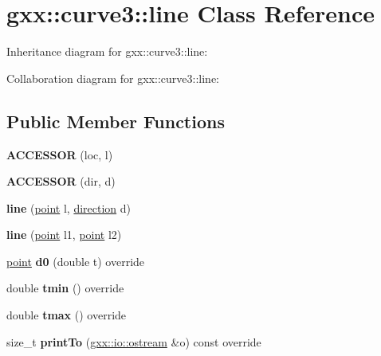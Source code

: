 \hypertarget{classgxx_1_1curve3_1_1line}{}\section{gxx\+:\+:curve3\+:\+:line Class Reference}
\label{classgxx_1_1curve3_1_1line}


Inheritance diagram for gxx\+:\+:curve3\+:\+:line\+:


Collaboration diagram for gxx\+:\+:curve3\+:\+:line\+:
\subsection*{Public Member Functions}
\begin{DoxyCompactItemize}
\item 
{\bfseries A\+C\+C\+E\+S\+S\+OR} (loc, l)\hypertarget{classgxx_1_1curve3_1_1line_a1ec94798b9efa81942915b0102aa3e0a}{}\label{classgxx_1_1curve3_1_1line_a1ec94798b9efa81942915b0102aa3e0a}

\item 
{\bfseries A\+C\+C\+E\+S\+S\+OR} (dir, d)\hypertarget{classgxx_1_1curve3_1_1line_ad53840b1f5abb3e4268d0608aeb6c220}{}\label{classgxx_1_1curve3_1_1line_ad53840b1f5abb3e4268d0608aeb6c220}

\item 
{\bfseries line} (\hyperlink{classgxx_1_1geom3_1_1point}{point} l, \hyperlink{classgxx_1_1geom3_1_1direction}{direction} d)\hypertarget{classgxx_1_1curve3_1_1line_affa66b223b6e57701a8d1c7cd0e0524d}{}\label{classgxx_1_1curve3_1_1line_affa66b223b6e57701a8d1c7cd0e0524d}

\item 
{\bfseries line} (\hyperlink{classgxx_1_1geom3_1_1point}{point} l1, \hyperlink{classgxx_1_1geom3_1_1point}{point} l2)\hypertarget{classgxx_1_1curve3_1_1line_ae2d76333ac4c3efbd1cbb59148359b4d}{}\label{classgxx_1_1curve3_1_1line_ae2d76333ac4c3efbd1cbb59148359b4d}

\item 
\hyperlink{classgxx_1_1geom3_1_1point}{point} {\bfseries d0} (double t) override\hypertarget{classgxx_1_1curve3_1_1line_a2ce5a22ed3b09aed447629135a938879}{}\label{classgxx_1_1curve3_1_1line_a2ce5a22ed3b09aed447629135a938879}

\item 
double {\bfseries tmin} () override\hypertarget{classgxx_1_1curve3_1_1line_a32fd55f7aeee4576727187fab6026286}{}\label{classgxx_1_1curve3_1_1line_a32fd55f7aeee4576727187fab6026286}

\item 
double {\bfseries tmax} () override\hypertarget{classgxx_1_1curve3_1_1line_adc409ec7fa49a399399dc7043944a7e7}{}\label{classgxx_1_1curve3_1_1line_adc409ec7fa49a399399dc7043944a7e7}

\item 
size\+\_\+t {\bfseries print\+To} (\hyperlink{classgxx_1_1io_1_1ostream}{gxx\+::io\+::ostream} \&o) const override\hypertarget{classgxx_1_1curve3_1_1line_a5a84dce8c9ed17fc944ebc9b9ff81cc4}{}\label{classgxx_1_1curve3_1_1line_a5a84dce8c9ed17fc944ebc9b9ff81cc4}

\end{DoxyCompactItemize}
